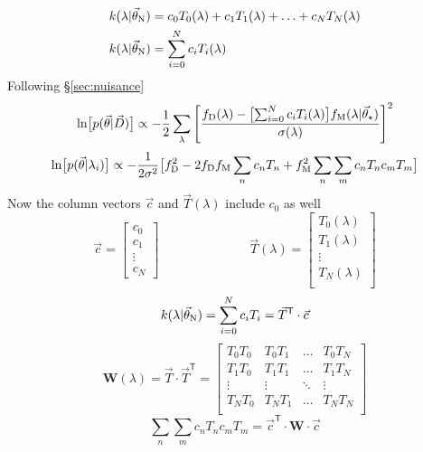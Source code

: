 \documentclass[preprint]{aastex} %
\newcommand{\vt}{\vec{\theta}}
\newcommand{\vstar}{\vt_{\star}}
\newcommand{\vN}{\vt_{\rm N}}
\newcommand{\vc}{\vec{c}}
\newcommand{\fM}{f_{\rm M}}
\newcommand{\fD}{f_{\rm D}}
\newcommand{\vD}{\vec{D}}
\newcommand{\trans}{\mathsf{T}}
\begin{document}
\begin{align}
  k(\lambda | \vN) &= c_0 T_0(\lambda) + c_1 T_1(\lambda) + \ldots + c_N T_N(\lambda) \\
  k(\lambda | \vN) &= \sum^N_{i = 0} c_i T_i(\lambda)
\end{align}
Following \S\ref{sec:nuisance}
\begin{equation}
  \ln \bigl [p(\vt | \vD) \bigr] \propto - \frac{1}{2} \sum_\lambda \left [\frac{\fD(\lambda) - \bigl [ \sum^N_{i = 0} c_i T_i(\lambda) \bigr ]\fM(\lambda | \vstar)  }{\sigma(\lambda)} \right ]^2
\end{equation}
\begin{equation}
 \ln \bigl [p(\vt | \lambda_i) \bigr] \propto -\frac{1}{2 \sigma^2} \bigl [ \fD^2 - 2 \fD \fM \sum_n c_n T_n + \fM^2 \sum_n \sum_m c_n T_n c_m T_m \bigr ]
 \end{equation}
Now the column vectors $\vc$ and $\vec{T}(\lambda)$ include $c_0$ as well
\begin{equation}
  \vc = 
  \begin{bmatrix}
    c_0\\
    c_1\\
    \vdots\\
    c_N
  \end{bmatrix}
  \hspace{3cm}
\vec{T}(\lambda) = 
\begin{bmatrix}
T_0(\lambda)\\
T_1(\lambda)\\
\vdots\\
T_N(\lambda)\\
\end{bmatrix}
\end{equation}
\begin{equation}
  k(\lambda | \vN) = \sum^N_{i = 0} c_i T_i = \vec{T}^\trans \cdot \vc
\end{equation}
\begin{equation}
  {\bm W}(\lambda) = \vec{T} \cdot \vec{T}^\trans = 
  \begin{bmatrix}
T_0 T_0 & T_0 T_1 &  \hdots & T_0 T_N \\
T_1 T_0 & T_1 T_1 &  \hdots & T_1 T_N \\
\vdots  & \vdots  &  \ddots & \vdots \\
T_N T_0 & T_N T_1 &  \hdots & T_N T_N \\
  \end{bmatrix}
\end{equation}
\begin{equation}
  \sum_n \sum_m c_n T_n c_m T_m = \vc^\trans \cdot {\bm W} \cdot \vc
\end{equation}
\end{document}
